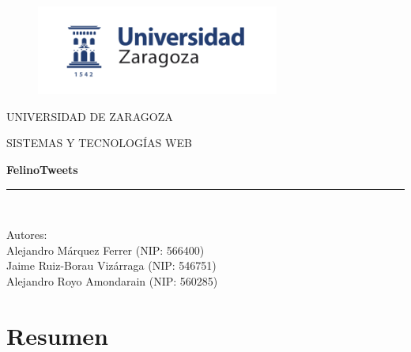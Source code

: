\documentclass[a4paper]{article}
\begin{document}
\begin{titlepage}

\begin{center}
\vspace*{-1in}
\begin{figure}[htb]
\begin{center}
\includegraphics[width=8cm]{logoUZ.png}
\end{center}
\end{figure}

\vspace*{0.3in}

UNIVERSIDAD DE ZARAGOZA \\

\vspace*{0.3in}

\begin{large}
SISTEMAS Y TECNOLOGÍAS WEB\\
\end{large}
\vspace*{0.2in}
\begin{Large}
\textbf{FelinoTweets} \\
\end{Large}
\vspace*{0.3in}
\begin{large}
\end{large}
\vspace*{0.5in}
\rule{80mm}{0.1mm}\\
\vspace*{0.1in}
\begin{large}
Autores: \\
Alejandro Márquez Ferrer (NIP: 566400)\\
Jaime Ruiz-Borau Vizárraga (NIP: 546751)\\
Alejandro Royo Amondarain (NIP: 560285)\\

\end{large}
\end{center}

\end{titlepage}
\tableofcontents

\newpage
\section{Resumen}
\end{document}
